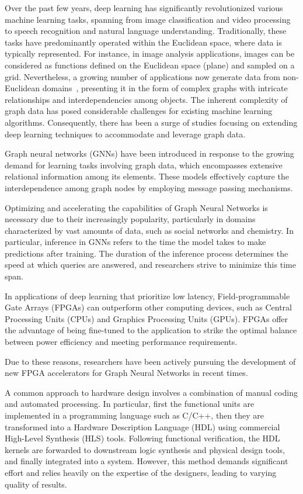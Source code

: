 Over the past few years, deep learning has significantly revolutionized various machine learning tasks,
spanning from image classification and video processing to speech recognition and natural language understanding.
Traditionally, these tasks have predominantly operated within the Euclidean space, where data is typically
represented.
For instance, in image analysis applications, images can be considered as functions defined on the Euclidean space (plane) and sampled on a grid.
Nevertheless, a growing number of applications now generate data from non-Euclidean domains~\cite{DBLP:journals/corr/BronsteinBLSV16},
presenting it in the form of complex graphs with intricate relationships and interdependencies among objects.
The inherent complexity of graph data has posed considerable challenges for existing machine learning algorithms.
Consequently, there has been a surge of studies focusing on extending deep learning techniques to accommodate
and leverage graph data.

Graph neural networks (GNNs) have been introduced in response to the growing demand for learning tasks involving
graph data, which encompasses extensive relational information among its elements.
These models effectively capture the interdependence among graph nodes by employing message passing mechanisms.

Optimizing and accelerating the capabilities of Graph Neural Networks is necessary due to their increasingly popularity, particularly in domains characterized by vast amounts of data,
such as social networks and chemistry.
In particular, inference in GNNs refers to the time the model takes to make predictions after training.
The duration of the inference process determines the speed at which queries are answered, and researchers strive to minimize this time span.

In applications of deep learning that prioritize low latency, Field-programmable Gate Arrays (FPGAs) can outperform other computing devices, such as Central Processing Units (CPUs) and Graphics Processing Units (GPUs).
FPGAs offer the advantage of being fine-tuned to the application to strike the optimal balance between power efficiency and meeting performance requirements.

Due to these reasons, researchers have been actively pursuing the development of new FPGA accelerators for Graph Neural Networks in recent times.

A common approach to hardware design involves a combination of manual coding and automated processing.
In particular, first the functional units are implemented in a programming language such as C/C++, then they are transformed into a Hardware Description Language (HDL) using commercial High-Level Synthesis (HLS) tools.
Following functional verification, the HDL kernels are forwarded to downstream logic synthesis and physical design tools, and finally integrated into a system.
However, this method demands significant effort and relies heavily on the expertise of the designers, leading to varying quality of results.

